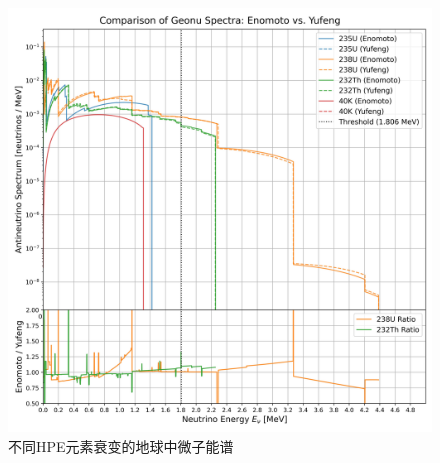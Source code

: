 				\begin{figure}[H]
					\centering
					\includegraphics[scale = 0.3]{./Pics/Comparison_of_All_Geonu_Spectra.jpg}
					\caption{不同HPE元素衰变的地球中微子能谱\cite{Enomoto_Spectrum, GeonSpectra-2024}}
					\label{Fig:Geonu Decay}
				\end{figure}
